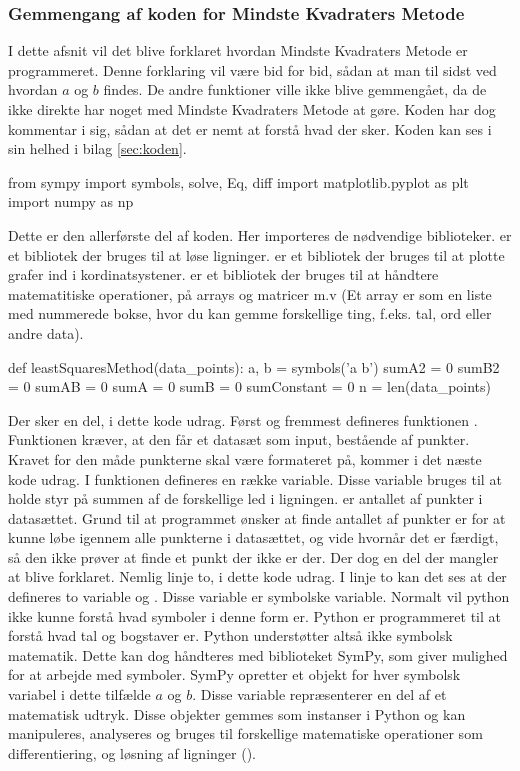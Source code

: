 \subsubsection{Gemmengang af koden for Mindste Kvadraters Metode}
I dette afsnit vil det blive forklaret hvordan Mindste Kvadraters Metode er programmeret. Denne forklaring vil være bid for bid, sådan at man til sidst ved hvordan $a$ og $b$ findes. De andre funktioner ville ikke blive gemmengået, da de ikke direkte har noget med Mindste Kvadraters Metode at gøre. Koden har dog kommentar i sig, sådan at det er nemt at forstå hvad der sker. Koden kan ses i sin helhed i bilag \ref{sec:koden}.
\begin{python}
    from sympy import symbols, solve, Eq, diff
    import matplotlib.pyplot as plt
    import numpy as np 
\end{python}
Dette er den allerførste del af koden. Her importeres de nødvendige biblioteker.  er et bibliotek der bruges til at løse ligninger.  er et bibliotek der bruges til at plotte grafer ind i kordinatsystener.  er et bibliotek der bruges til at håndtere matematitiske operationer, på arrays og matricer m.v (Et array er som en liste med nummerede bokse, hvor du kan gemme forskellige ting, f.eks. tal, ord eller andre data). 
\begin{python}
    def leastSquaresMethod(data_points):
        a, b = symbols('a b')
        sumA2 = 0
        sumB2 = 0
        sumAB = 0
        sumA = 0
        sumB = 0 
        sumConstant = 0
        n = len(data_points)
\end{python}
Der sker en del, i dette kode udrag. Først og fremmest defineres funktionen . Funktionen kræver, at den får et datasæt som input, bestående af punkter. Kravet for den måde punkterne skal være formateret på, kommer i det næste kode udrag. I funktionen defineres en række variable. Disse variable bruges til at holde styr på summen af de forskellige led i ligningen.  er antallet af punkter i datasættet. Grund til at programmet ønsker at finde antallet af punkter er for at kunne løbe igennem alle punkterne i datasættet, og vide hvornår det er færdigt, så den ikke prøver at finde et punkt der ikke er der. Der dog en del der mangler at blive forklaret. Nemlig linje to, i dette kode udrag. I linje to kan det ses at der defineres to variable  og . Disse variable er symbolske variable. Normalt vil python ikke kunne forstå hvad symboler i denne form er. Python er programmeret til at forstå hvad tal og bogstaver er. Python understøtter altså ikke symbolsk matematik. Dette kan dog håndteres med biblioteket SymPy, som giver mulighed for at arbejde med symboler. SymPy opretter et objekt for hver symbolsk variabel i dette tilfælde $a$ og $b$. Disse variable repræsenterer en del af et matematisk udtryk. Disse objekter gemmes som instanser i Python og kan manipuleres, analyseres og bruges til forskellige matematiske operationer som differentiering, og løsning af ligninger (\cite{matematiskeSymboler}).

